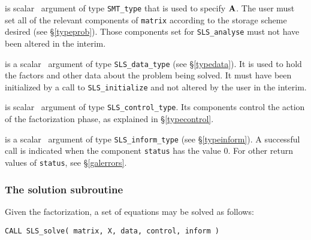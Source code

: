 \documentclass{galahad}
\newcommand{\packagename}{SLS}
\begin{document}
\begin{description}

 is scalar \intentin\ argument of type {\tt SMT\_type}
that is used to specify ${\mathbf{A}}$.
The user must set all of the relevant components of {\tt matrix} according
to the storage scheme desired (see \S\ref{typeprob}). Those components
set for {\tt \packagename\_analyse} must not have been altered in the interim.

 is a scalar \intentinout\ argument of type
{\tt \packagename\_data\_type}
(see \S\ref{typedata}). It is used to hold the factors and other
data about the problem being solved.
It must have been initialized by a call to
{\tt \packagename\_ini\-tialize} and not altered by the user in the interim.

 is scalar \intentin\ argument of type
{\tt \packagename\_control\_type}. Its components control the action
of the factorization phase, as explained in
\S\ref{typecontrol}.

 is a scalar \intentinout\ argument of type
{\tt \packagename\_inform\_type}
(see \S\ref{typeinform}).
A successful call is indicated when the  component {\tt status} has the value 0.
For other return values of {\tt status}, see \S\ref{galerrors}.

\end{description}


\subsubsection{The solution subroutine}
\label{solve}
Given the factorization, a set of equations may be solved as follows:

\hskip0.5in
{\tt CALL \packagename\_solve( matrix, X, data, control, inform )}
\end{document}
